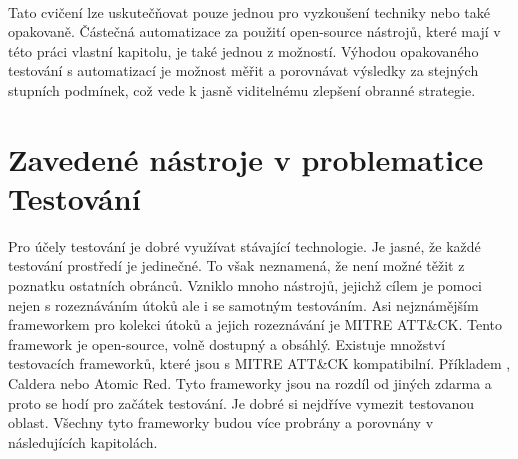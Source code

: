 \paragraph{}
Tato cvičení lze uskutečňovat pouze jednou pro vyzkoušení techniky nebo také opakovaně.
Částečná automatizace za použití open-source nástrojů, které mají v této práci vlastní kapitolu, je také jednou z možností.
Výhodou opakovaného testování s automatizací je možnost měřit a porovnávat výsledky za stejných stupních podmínek, což vede k jasně viditelnému zlepšení obranné strategie.\cite{securityInteligence_pen_test_red_team_purple_team,redscan_team_purple_team}

\section{Zavedené nástroje v problematice Testování}
Pro účely testování je dobré využívat stávající technologie.
Je jasné, že každé testování prostředí je jedinečné.
To však neznamená, že není možné těžit z poznatku ostatních obránců.
Vzniklo mnoho nástrojů, jejichž cílem je pomoci nejen s rozeznáváním útoků ale i se samotným testováním.
Asi nejznámějším frameworkem pro kolekci útoků a jejich rozeznávání je MITRE ATT\&CK\cite{mitre_attack_framework}.
Tento framework je open-source, volně dostupný a obsáhlý.
Existuje množství testovacích frameworků, které jsou s MITRE ATT\&CK kompatibilní\cite{csoonline_4_testing_frameworks}.
Příkladem , Caldera nebo Atomic Red.
Tyto frameworky jsou na rozdíl od jiných zdarma a proto se hodí pro začátek testování.
Je dobré si nejdříve vymezit testovanou oblast.
Všechny tyto frameworky budou více probrány a porovnány v následujících kapitolách.

